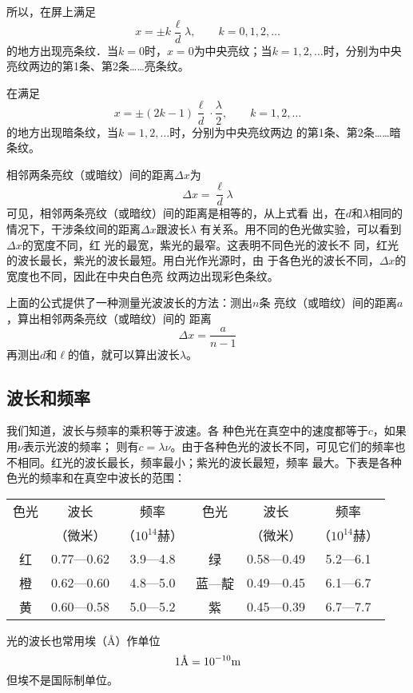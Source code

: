 所以，在屏上满足
\[x=\pm k\frac{\ell}{d}\lambda, \qquad k=0,1,2,\ldots \]
的地方出现亮条纹．当$k=0$时，$x=0$为中央亮纹；当$k=1,
2,\ldots$时，分别为中央亮纹两边的第1条、第2条……亮条纹。

在满足
\[x=\pm(2k-1)\frac{\ell}{d}\cdot \frac{\lambda}{2},\qquad k=1,2,\ldots \]
的地方出现暗条纹，当$k=1,2,\ldots$时，分别为中央亮纹两边
的第1条、第2条……暗条纹。

相邻两条亮纹（或暗纹）间的距离$\Delta x$为
\[\Delta x=\frac{\ell}{d}\lambda \]
可见，相邻两条亮纹（或暗纹）间的距离是相等的，从上式看
出，在$d$和$\lambda$相同的情况下，干涉条纹间的距离$\Delta x$跟波长$\lambda$
有关系。用不同的色光做实验，可以看到$\Delta x$的宽度不同，红
光的最宽，紫光的最窄。这表明不同色光的波长不
同，红光的波长最长，紫光的波长最短。用白光作光源时，由
于各色光的波长不同，$\Delta x$的宽度也不同，因此在中央白色亮
纹两边出现彩色条纹。

上面的公式提供了一种测量光波波长的方法：测出$n$条
亮纹（或暗纹）间的距离$a$，算出相邻两条亮纹（或暗纹）间的
距离
\[\Delta x=\frac{a}{n-1} \]
再测出$d$和$\ell$的值，就可以算出波长$\lambda$。

\subsection{波长和频率}

我们知道，波长与频率的乘积等于波速。各
种色光在真空中的速度都等于$c$，如果用$\nu$表示光波的频率；
则有$c=\lambda\nu$。由于各种色光的波长不同，可见它们的频率也
不相同。红光的波长最长，频率最小；紫光的波长最短，频率
最大。下表是各种色光的频率和在真空中波长的范围：
\begin{center}
    \begin{tabular}{cccccc}
        \hline
        色光   &     波长    &    频率    &    色光    &    波长   &     频率     \\
        &（微米）&（$10^{14}$赫）&    &（微米）&（$10^{14}$赫）\\
        \hline
        红   &  0.77—0.62   &     3.9—4.8    &    绿&0.58—0.49    &    5.2—6.1\\
        橙   & 0.62—0.60    &    4.8—5.0     &   蓝—靛    &    0.49—0.45    &    6.1—6.7\\
        黄&0.60—0.58   &     5.0—5.2     &   紫      &  0.45—0.39      &  6.7—7.7\\
        \hline
    \end{tabular}
\end{center}

光的波长也常用埃（\AA）作单位
\[1\text{\AA}=10^{-10}{\rm m}\]
但埃不是国际制单位。

